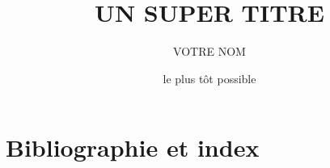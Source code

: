 \documentclass[
a4paper,
11pt,
twoside,
onecolumn,
openright,      %
shotrims,       %
leqno,          %
final   %
]{memoir}
\begin{document}
%
%
\title{UN SUPER TITRE}
\date{le plus tôt possible}
\author{VOTRE NOM}

\frontmatter







\dominitoc
\tableofcontents
\mtcaddchapter[]
\clearpage
\listoffigures
\mtcaddchapter[]
\clearpage

\mainmatter







\backmatter


\part{Bibliographie et index}



\end{document}
